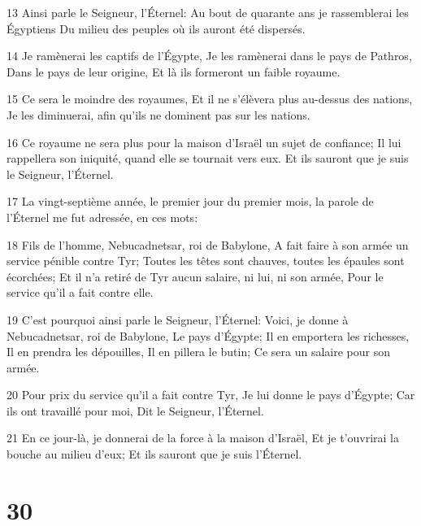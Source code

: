 \par 13 Ainsi parle le Seigneur, l'Éternel: Au bout de quarante ans je rassemblerai les Égyptiens Du milieu des peuples où ils auront été dispersés.
\par 14 Je ramènerai les captifs de l'Égypte, Je les ramènerai dans le pays de Pathros, Dans le pays de leur origine, Et là ils formeront un faible royaume.
\par 15 Ce sera le moindre des royaumes, Et il ne s'élèvera plus au-dessus des nations, Je les diminuerai, afin qu'ils ne dominent pas sur les nations.
\par 16 Ce royaume ne sera plus pour la maison d'Israël un sujet de confiance; Il lui rappellera son iniquité, quand elle se tournait vers eux. Et ils sauront que je suis le Seigneur, l'Éternel.
\par 17 La vingt-septième année, le premier jour du premier mois, la parole de l'Éternel me fut adressée, en ces mots:
\par 18 Fils de l'homme, Nebucadnetsar, roi de Babylone, A fait faire à son armée un service pénible contre Tyr; Toutes les têtes sont chauves, toutes les épaules sont écorchées; Et il n'a retiré de Tyr aucun salaire, ni lui, ni son armée, Pour le service qu'il a fait contre elle.
\par 19 C'est pourquoi ainsi parle le Seigneur, l'Éternel: Voici, je donne à Nebucadnetsar, roi de Babylone, Le pays d'Égypte; Il en emportera les richesses, Il en prendra les dépouilles, Il en pillera le butin; Ce sera un salaire pour son armée.
\par 20 Pour prix du service qu'il a fait contre Tyr, Je lui donne le pays d'Égypte; Car ils ont travaillé pour moi, Dit le Seigneur, l'Éternel.
\par 21 En ce jour-là, je donnerai de la force à la maison d'Israël, Et je t'ouvrirai la bouche au milieu d'eux; Et ils sauront que je suis l'Éternel.

\chapter{30}

